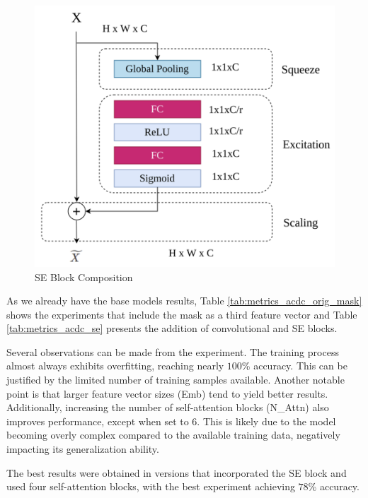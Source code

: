 \documentclass[journal,twoside,web]{ieeecolor}
\begin{document}
\begin{figure}[h]
    \centerline{\includegraphics[width=\columnwidth]{figures/fig06.png}}
    \caption{SE Block Composition}
    \label{fig06}
\end{figure}

As we already have the base models results,  Table \ref{tab:metrics_acdc_orig_mask} shows the experiments that include the mask as a third feature vector and Table \ref{tab:metrics_acdc_se} presents the addition of convolutional and \gls{SE} blocks.  

Several observations can be made from the experiment. The training process almost always exhibits overfitting, reaching nearly $100$\% accuracy. This can be justified by the limited number of training samples available. Another notable point is that larger feature vector sizes (Emb) tend to yield better results. Additionally, increasing the number of self-attention blocks (N\_Attn) also improves performance, except when set to 6. This is likely due to the model becoming overly complex compared to the available training data, negatively impacting its generalization ability.  

The best results were obtained in versions that incorporated the \gls{SE} block and used four self-attention blocks, with the best experiment achieving $78$\% accuracy.
\end{document}
